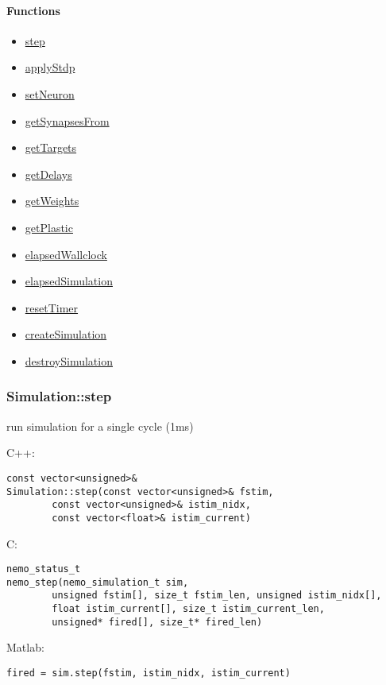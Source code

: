 \paragraph{Functions}
\begin{itemize}
\item \hyperref[fn: step]{step}
\item \hyperref[fn: applyStdp]{applyStdp}
\item \hyperref[fn: setNeuron]{setNeuron}
\item \hyperref[fn: getSynapsesFrom]{getSynapsesFrom}
\item \hyperref[fn: getTargets]{getTargets}
\item \hyperref[fn: getDelays]{getDelays}
\item \hyperref[fn: getWeights]{getWeights}
\item \hyperref[fn: getPlastic]{getPlastic}
\item \hyperref[fn: elapsedWallclock]{elapsedWallclock}
\item \hyperref[fn: elapsedSimulation]{elapsedSimulation}
\item \hyperref[fn: resetTimer]{resetTimer}
\item \hyperref[fn: createSimulation]{createSimulation}
\item \hyperref[fn: destroySimulation]{destroySimulation}
\end{itemize}
\clearpage
\subsubsection*{Simulation::step}
\label{fn: step}
run simulation for a single cycle (1ms)


\noindent C++:
\begin{lstlisting}[aboveskip=2pt]
const vector<unsigned>&
Simulation::step(const vector<unsigned>& fstim, 
        const vector<unsigned>& istim_nidx, 
        const vector<float>& istim_current)
\end{lstlisting}

\noindent C:
\begin{lstlisting}[aboveskip=2pt]
nemo_status_t
nemo_step(nemo_simulation_t sim, 
        unsigned fstim[], size_t fstim_len, unsigned istim_nidx[], 
        float istim_current[], size_t istim_current_len, 
        unsigned* fired[], size_t* fired_len)
\end{lstlisting}

\noindent Matlab:
\begin{lstlisting}[aboveskip=2pt]
fired = sim.step(fstim, istim_nidx, istim_current)
\end{lstlisting}
